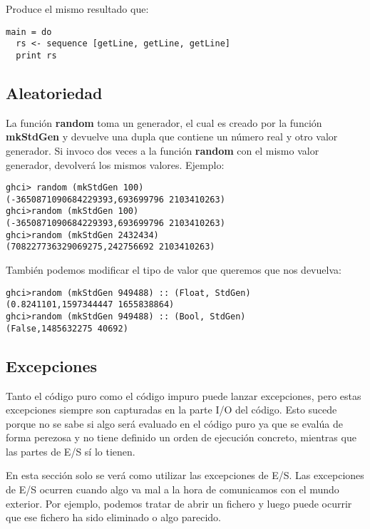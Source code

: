 Produce el mismo resultado que:

\begin{lstlisting}
main = do
  rs <- sequence [getLine, getLine, getLine]
  print rs
\end{lstlisting}


\subsection{Aleatoriedad} %
\label{sub:aleatoriedad}

La función \textbf{random} toma un generador, el cual es creado por la función \textbf{mkStdGen} y devuelve una dupla que contiene un número real y otro valor generador.
Si invoco dos veces a la función \textbf{random} con el mismo valor generador, devolverá los mismos valores. Ejemplo:

\begin{lstlisting}
ghci> random (mkStdGen 100)
(-3650871090684229393,693699796 2103410263)
ghci>random (mkStdGen 100)
(-3650871090684229393,693699796 2103410263)
ghci>random (mkStdGen 2432434)
(708227736329069275,242756692 2103410263)
\end{lstlisting}

También podemos modificar el tipo de valor que queremos que nos devuelva:

\begin{lstlisting}
ghci>random (mkStdGen 949488) :: (Float, StdGen)
(0.8241101,1597344447 1655838864)
ghci>random (mkStdGen 949488) :: (Bool, StdGen)
(False,1485632275 40692)
\end{lstlisting}



\subsection{Excepciones} %
\label{sub:excepciones}


Tanto el código puro como el código impuro puede lanzar excepciones, pero estas excepciones siempre son capturadas en la parte I/O del código. Esto sucede porque no se sabe si algo será
evaluado en el código puro ya que se evalúa de forma perezosa y no tiene definido un orden de ejecución concreto, mientras que las partes de E/S sí lo tienen.

En esta sección solo se verá como utilizar las excepciones de E/S.
Las excepciones de E/S ocurren cuando algo va mal a la hora de comunicamos con el mundo exterior. Por ejemplo, podemos tratar de abrir un fichero y luego puede ocurrir que ese fichero ha sido eliminado o algo parecido.

